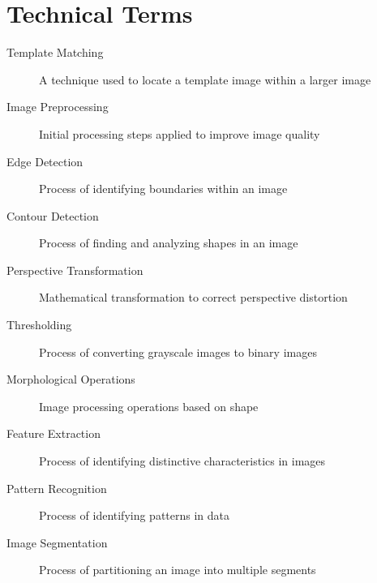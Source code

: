 \section*{Technical Terms}
\begin{description}
\item[Template Matching] A technique used to locate a template image within a larger image
\item[Image Preprocessing] Initial processing steps applied to improve image quality
\item[Edge Detection] Process of identifying boundaries within an image
\item[Contour Detection] Process of finding and analyzing shapes in an image
\item[Perspective Transformation] Mathematical transformation to correct perspective distortion
\item[Thresholding] Process of converting grayscale images to binary images
\item[Morphological Operations] Image processing operations based on shape
\item[Feature Extraction] Process of identifying distinctive characteristics in images
\item[Pattern Recognition] Process of identifying patterns in data
\item[Image Segmentation] Process of partitioning an image into multiple segments
\end{description}